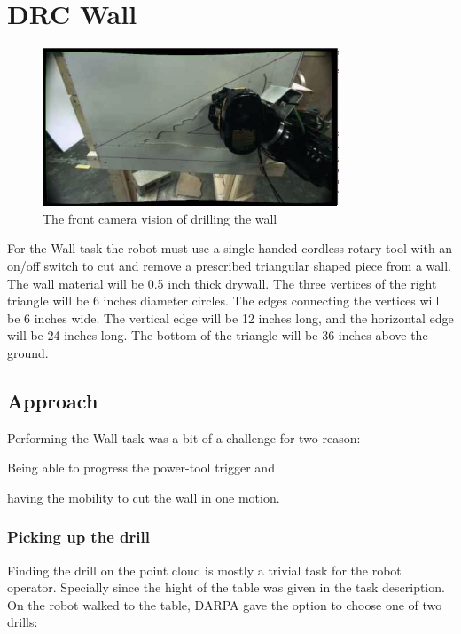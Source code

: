 \documentclass{article}
\begin{document}
\section{DRC Wall}
\begin{figure}
  \begin{center}
    \includegraphics[scale=0.5]{images/drilling2.png}
  \end{center}
  \caption{The front camera vision of drilling the wall}
\end{figure}
For the Wall task the robot must use a single handed cordless rotary tool with an on/off switch to cut and remove a prescribed triangular shaped piece from a wall. The wall material will be 0.5 inch thick drywall. The three vertices of the right triangle will be 6 inches diameter circles. The edges connecting the vertices will be 6 inches wide. The vertical edge will be 12 inches long, and the horizontal edge will be 24 inches long. The bottom of the triangle will be 36 inches above the ground. \cite{walltask}

\subsection{Approach}
Performing the Wall task was a bit of a challenge for two reason: \begin{inparaenum}
\item Being able to progress the power-tool trigger and 
\item having the mobility to cut the wall in one motion. \end{inparaenum} 

\subsubsection{Picking up the drill}
Finding the drill on the point cloud is mostly a trivial task for the robot operator. Specially since the hight of the table was given in the task description. On the robot walked to the table, DARPA gave the option to choose one of two drills:
\end{document}
